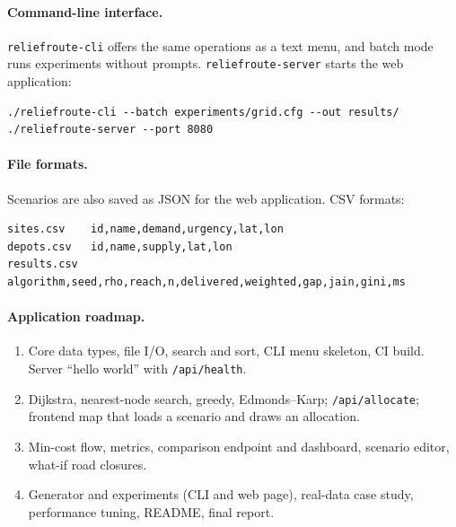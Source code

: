 \documentclass[11pt]{article}
\begin{document}
\paragraph{Command-line interface.}
\texttt{reliefroute-cli} offers the same operations as a text menu, and
batch mode runs experiments without prompts. \texttt{reliefroute-server}
starts the web application:
\begin{verbatim}
./reliefroute-cli --batch experiments/grid.cfg --out results/
./reliefroute-server --port 8080
\end{verbatim}

\paragraph{File formats.}
Scenarios are also saved as JSON for the web application. CSV formats:
\begin{verbatim}
sites.csv    id,name,demand,urgency,lat,lon
depots.csv   id,name,supply,lat,lon
results.csv  algorithm,seed,rho,reach,n,delivered,weighted,gap,jain,gini,ms
\end{verbatim}

\paragraph{Application roadmap.}
\begin{enumerate}[label=Iteration \arabic*:,leftmargin=*]
  \item Core data types, file I/O, search and sort, CLI menu skeleton, CI
        build. Server ``hello world'' with \texttt{/api/health}.
  \item Dijkstra, nearest-node search, greedy, Edmonds--Karp; \texttt{/api/allocate};
        frontend map that loads a scenario and draws an allocation.
  \item Min-cost flow, metrics, comparison endpoint and dashboard, scenario
        editor, what-if road closures.
  \item Generator and experiments (CLI and web page), real-data case study,
        performance tuning, README, final report.
\end{enumerate}
\end{document}
